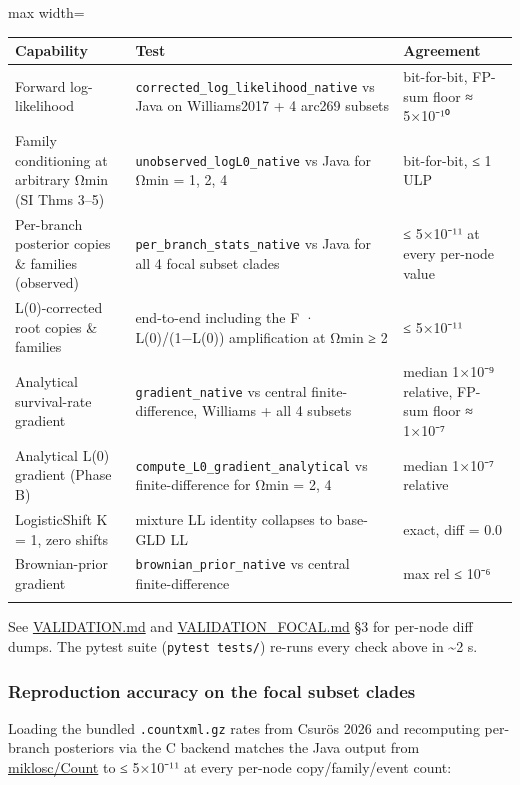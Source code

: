 \documentclass[
  10pt,
]{article}
\begin{document}
\begin{center}
\begin{adjustbox}{max width=\textwidth}
\begin{tabular}{@{}lll@{}}
\toprule\noalign{}
Capability & Test & Agreement \\
\midrule\noalign{}
Forward log-likelihood & \texttt{corrected\_log\_likelihood\_native} vs
Java on Williams2017 + 4 arc269 subsets & bit-for-bit, FP-sum floor ≈
5×10⁻¹⁰ \\
Family conditioning at arbitrary Ωmin (SI Thms 3--5) &
\texttt{unobserved\_logL0\_native} vs Java for Ωmin = 1, 2, 4 &
bit-for-bit, ≤ 1 ULP \\
Per-branch posterior copies \& families (observed) &
\texttt{per\_branch\_stats\_native} vs Java for all 4 focal subset
clades & ≤ 5×10⁻¹¹ at every per-node value \\
L(0)-corrected root copies \& families & end-to-end including the F ·
L(0)/(1−L(0)) amplification at Ωmin ≥ 2 & ≤ 5×10⁻¹¹ \\
Analytical survival-rate gradient & \texttt{gradient\_native} vs central
finite-difference, Williams + all 4 subsets & median 1×10⁻⁹ relative,
FP-sum floor ≈ 1×10⁻⁷ \\
Analytical L(0) gradient (Phase B) &
\texttt{compute\_L0\_gradient\_analytical} vs finite-difference for Ωmin
= 2, 4 & median 1×10⁻⁷ relative \\
LogisticShift K = 1, zero shifts & mixture LL identity collapses to
base-GLD LL & exact, diff = 0.0 \\
Brownian-prior gradient & \texttt{brownian\_prior\_native} vs central
finite-difference & max rel ≤ 10⁻⁶ \\
\bottomrule\noalign{}
\end{tabular}
\end{adjustbox}
\end{center}

See \url{VALIDATION.md} and \url{VALIDATION_FOCAL.md} §3 for per-node
diff dumps. The pytest suite (\texttt{pytest\ tests/}) re-runs every
check above in \textasciitilde2 s.

\subsubsection{Reproduction accuracy on the focal subset
clades}\label{reproduction-accuracy-on-the-focal-subset-clades}

Loading the bundled \texttt{.countxml.gz} rates from Csurös 2026 and
recomputing per-branch posteriors via the C backend matches the Java
output from \href{https://github.com/miklosc/Count}{miklosc/Count} to ≤
5×10⁻¹¹ at every per-node copy/family/event count:
\end{document}
